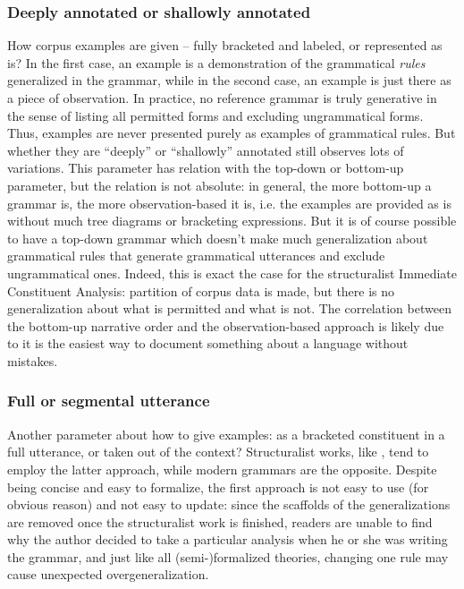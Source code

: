 \documentclass[UTF8, a4paper, oneside, scheme=plain]{ctexart}
\newcommand*{\term}[1]{\emph{#1}}
\begin{document}
\subsubsection{Deeply annotated or shallowly annotated}

How corpus examples are given -- fully bracketed and labeled, or represented as is?
In the first case, 
an example is a demonstration of the grammatical \term{rules} generalized in the grammar,
while in the second case,
an example is just there as a piece of observation.
In practice, no reference grammar is truly generative 
in the sense of listing all permitted forms and excluding ungrammatical forms.
Thus, examples are never presented purely as examples of grammatical rules.
But whether they are ``deeply'' or ``shallowly'' annotated still observes lots of variations.
This parameter has relation with the top-down or bottom-up parameter,
but the relation is not absolute:
in general, the more bottom-up a grammar is, the more observation-based it is, 
i.e. the examples are provided as is without much tree diagrams or bracketing expressions.
But it is of course possible to have a top-down grammar 
which doesn't make much generalization about grammatical rules 
that generate grammatical utterances 
and exclude ungrammatical ones.
Indeed, this is exact the case for the structuralist Immediate Constituent Analysis:
partition of corpus data is made,
but there is no generalization about what is permitted and what is not.
The correlation between the bottom-up narrative order and the observation-based approach 
is likely due to it is the easiest way 
to document something about a language without mistakes.

\subsubsection{Full or segmental utterance}

Another parameter about how to give examples: as a bracketed constituent in a full utterance,
or taken out of the context?
Structuralist works, like \citet{chao1965grammar}, tend to employ the latter approach,
while modern grammars are the opposite.
Despite being concise and easy to formalize,
the first approach is not easy to use (for obvious reason) 
and not easy to update:
since the scaffolds of the generalizations are removed once the structuralist work is finished,
readers are unable to find why the author decided to take a particular analysis 
when he or she was writing the grammar,
and just like all (semi-)formalized theories,
changing one rule may cause unexpected overgeneralization.
\end{document}
